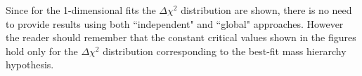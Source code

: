 Since for the 1-dimensional fits the $\Delta \chi^2$ distribution are shown,
there is no need to provide results using both ``independent" and ``global" approaches.
However the reader should remember that the constant critical values 
shown in the figures hold only for the $\Delta \chi^2$ distribution corresponding to the best-fit mass hierarchy hypothesis.





%
%
%


\newpage











